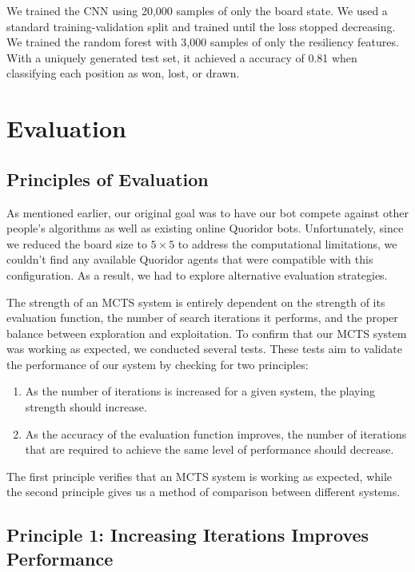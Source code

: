 \documentclass[10pt]{article}
\begin{document}
We trained the CNN using 20,000 samples of only the board state. We used a standard training-validation split and trained until the loss stopped decreasing. We trained the random forest with 3,000 samples of only the resiliency features. With a uniquely generated test set, it achieved a accuracy of 0.81 when classifying each position as won, lost, or drawn.


\section{Evaluation}

\subsection{Principles of Evaluation}

As mentioned earlier, our original goal was to have our bot compete against other people's algorithms as well as existing online Quoridor bots. Unfortunately, since we reduced the board size to $5 \times 5$ to address the computational limitations, we couldn't find any available Quoridor agents that were compatible with this configuration. As a result, we had to explore alternative evaluation strategies.

The strength of an MCTS system is entirely dependent on the strength of its evaluation function, the number of search iterations it performs, and the proper balance between exploration and exploitation. To confirm that our MCTS system was working as expected, we conducted several tests. These tests aim to validate the performance of our system by checking for two principles:

\begin{enumerate}
    \item As the number of iterations is increased for a given system, the playing strength should increase.
    \item As the accuracy of the evaluation function improves, the number of iterations that are required to achieve the same level of performance should decrease.
\end{enumerate}

The first principle verifies that an MCTS system is working as expected, while the second principle gives us a method of comparison between different systems.

\subsection{Principle 1: Increasing Iterations Improves Performance}
\label{sec:moreitersisbetter}
\end{document}
